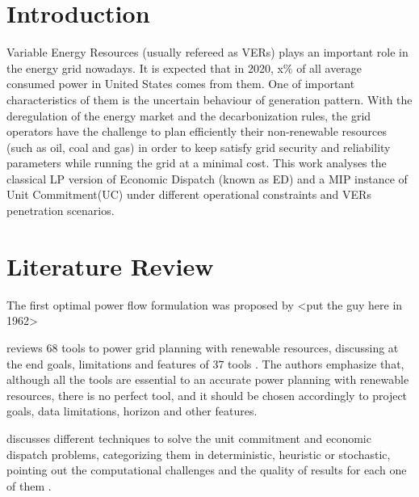 \documentclass[12pt,LUDisStyle,twosided]{book}
\begin{document}
\pagestyle{plain}
\dissertationtrue



\tableofcontents
\nopagebreak
{}
\listoftables
{}
\listoffigures
\newpage
\pagestyle{plain}

\pagestyle{plain}

\chapter{Introduction}

Variable Energy Resources (usually refereed as VERs) plays an important role in the energy grid nowadays. It is expected that in 2020, x\% of all average consumed power in United States comes from them. One of important characteristics of them is the uncertain behaviour of generation pattern. With the deregulation of the energy market and the decarbonization rules, the grid operators have the challenge to plan efficiently their non-renewable resources (such as oil, coal and gas) in order to keep satisfy grid security and reliability parameters while running the grid at a minimal cost. This work analyses the classical LP version of Economic Dispatch (known as ED) and a MIP instance of Unit Commitment(UC) under different operational constraints and VERs penetration  scenarios.

\chapter{Literature Review}


The first optimal power flow formulation was proposed by <put the guy here in 1962>

\citeauthor{connolly} reviews 68 tools to power grid planning with renewable resources, discussing at the end goals, limitations and features of 37 tools \cite{connolly}. The authors emphasize that, although all the tools are essential to an accurate power planning with renewable resources, there is no perfect tool, and it should be chosen accordingly to project goals, data limitations, horizon and other features. 

\citeauthor{yamin} discusses different techniques to solve the unit commitment and economic dispatch problems, categorizing them in deterministic, heuristic or stochastic, pointing out the computational challenges and the quality of results for each one of them \cite{yamin}. 
\end{document}

